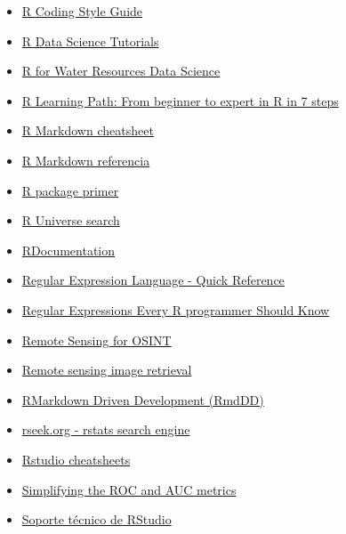 \documentclass[
  letterpaper,
  DIV=11,
  numbers=noendperiod]{scrartcl}
\begin{document}
\begin{itemize}
{  Best practices}
\item
  \href{https://irudnyts.github.io//r-coding-style-guide/}{R Coding
  Style Guide}
\item
  \href{https://github.com/ujjwalkarn/DataScienceR}{R Data Science
  Tutorials}
\item
  \href{https://www.r4wrds.com/}{R for Water Resources Data Science}
\item
  \href{https://www.kdnuggets.com/2016/03/datacamp-r-learning-path-7-steps.html}{R
  Learning Path: From beginner to expert in R in 7 steps}
\item
  \href{https://raw.githubusercontent.com/rstudio/cheatsheets/main/rmarkdown.pdf}{R
  Markdown cheatsheet}
\item
  \href{https://www.rstudio.com/wp-content/uploads/2015/03/rmarkdown-reference.pdf}{R
  Markdown referencia}
\item
  \href{https://kbroman.org/pkg_primer/}{R package primer}
\item
  \href{https://r-universe.dev/search}{R Universe search}
\item
  \href{https://www.rdocumentation.org/}{RDocumentation}
\item
  \href{https://docs.microsoft.com/en-us/dotnet/standard/base-types/regular-expression-language-quick-reference}{Regular
  Expression Language - Quick Reference}
\item
  \href{https://www.r-bloggers.com/regular-expressions-every-r-programmer-should-know/}{Regular
  Expressions Every R programmer Should Know}
\item
  \href{https://bellingcat.github.io/RS4OSINT/}{Remote Sensing for
  OSINT}
\item
  \href{https://github.com/IBM/remote-sensing-image-retrieval}{Remote
  sensing image retrieval}
\item
  \href{https://emilyriederer.netlify.app/post/rmarkdown-driven-development/}{RMarkdown
  Driven Development (RmdDD)}
\item
  \href{https://rseek.org/}{rseek.org - rstats search engine}
\item
  \href{https://www.rstudio.com/resources/cheatsheets/?utm_content=buffer1b56a&utm_medium=social&utm_source=twitter.com&utm_campaign=buffer}{Rstudio
  cheatsheets}
\item
  \href{https://towardsdatascience.com/understanding-the-roc-and-auc-curves-a05b68550b69}{Simplifying
  the ROC and AUC metrics}
\item
  \href{https://support.posit.co/hc/en-us}{Soporte técnico de RStudio}

\end{itemize}
\end{document}

